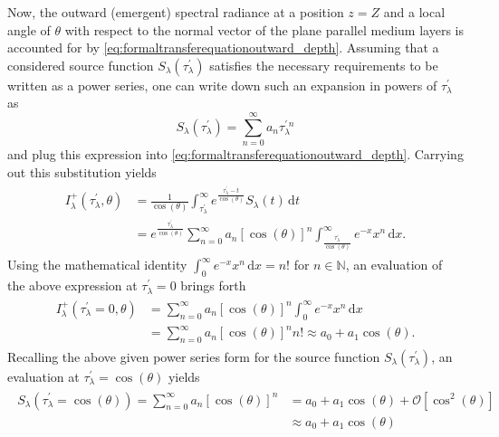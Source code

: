 \documentclass[a4paper,11pt]{report}
\begin{document}
Now, the outward (emergent) spectral radiance at a position $z=Z$ and a local angle of $\theta$ with respect to the normal vector of the plane parallel medium layers is accounted for by \cref{eq:formaltransferequationoutward_depth}. Assuming that a considered source function $S_\lambda(\tau_\lambda^\prime)$ satisfies the necessary requirements to be written as a power series, one can write down such an expansion in powers of $\tau_\lambda^\prime$ as \begin{equation}
S_\lambda(\tau_\lambda^\prime) = \sum_{n=0}^{\infty}a_n\tau_\lambda^{\prime\,n}
\end{equation} and plug this expression into \cref{eq:formaltransferequationoutward_depth}. Carrying out this substitution yields \begin{align}
\begin{aligned}
I^+_\lambda(\tau_\lambda^\prime, \theta) &= \frac{1}{\cos(\theta)}\int_{\tau^\prime_\lambda}^{\infty} e^{\frac{\tau_\lambda^\prime - t}{\cos(\theta)}}S_\lambda(t)\,\mathrm{d}t \\ &= e^{\frac{\tau_\lambda^\prime}{\cos(\theta)}}\sum_{n=0}^{\infty}a_n[\cos(\theta)]^n\int_{\frac{\tau^\prime_\lambda}{\cos(\theta)}}^{\infty} e^{-x}x^n\,\mathrm{d}x.
\end{aligned}
\end{align} Using the mathematical identity $\int_{0}^{\infty} e^{-x}x^n\,\mathrm{d}x = n!$ for $n \in \mathbb{N}$, an evaluation of the above expression at $\tau_\lambda^\prime = 0$ brings forth \begin{align}\label{eq:derivation_eddington_barbier_1}
\begin{aligned}
I_\lambda^+(\tau_\lambda^\prime = 0, \theta) &= \sum_{n=0}^{\infty}a_n\left[\cos(\theta)\right]^n\int_{0}^{\infty}e^{-x}x^n\,\mathrm{d}x \\ &= \sum_{n=0}^{\infty}a_n \left[\cos(\theta)\right]^n n! \approx a_0 + a_1\cos(\theta).
\end{aligned}
\end{align} Recalling the above given power series form for the source function $S_\lambda(\tau_\lambda^\prime)$, an evaluation at $\tau^\prime_\lambda = \cos(\theta)$ yields \begin{align}\begin{aligned}\label{eq:derivation_eddington_barbier_2}
S_\lambda(\tau_\lambda^\prime = \cos(\theta)) = \sum_{n=0}^{\infty} a_n\left[\cos(\theta)\right]^n &= a_0 + a_1\cos(\theta) + \mathcal{O}[\cos^2(\theta)] \\
&\approx a_0 + a_1\cos(\theta)

\end{aligned}
\end{align}
\end{document}

